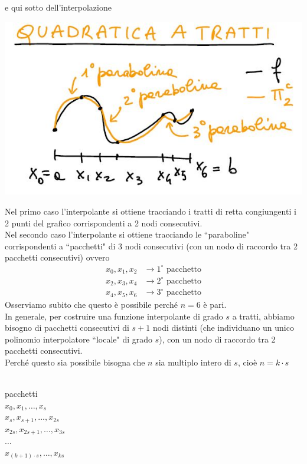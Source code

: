 \documentclass[12pt,a4paper]{article}
\begin{document}
e qui sotto dell'interpolazione\\
\begin{center}
    \includegraphics[scale=0.5]{calcolo3.JPG}
\end{center}
Nel primo caso l'interpolante si ottiene tracciando i tratti di retta congiungenti i 2 punti del grafico corrispondenti a 2 nodi consecutivi.\\
Nel secondo caso l'interpolante si ottiene tracciando le ``paraboline" corrispondenti a ``pacchetti" di 3 nodi consecutivi (con un nodo di raccordo tra 2 pacchetti consecutivi) ovvero
\[\begin{split}
    x_0,x_1,x_2 & \rightarrow 1^\circ \text{ pacchetto}\\
    x_2,x_3,x_4 & \rightarrow 2^\circ \text{ pacchetto}\\
    x_4,x_5,x_6 & \rightarrow 3^\circ \text{ pacchetto}
\end{split}\]
Osserviamo subito che questo è possibile perché $n=6$ è pari.\\
In generale, per costruire una funzione interpolante di grado $s$ a tratti, abbiamo bisogno di pacchetti consecutivi di $s+1$ nodi distinti (che individuano un unico polinomio interpolatore ``locale" di grado $s$), con un nodo di raccordo tra 2 pacchetti consecutivi.\\
Perché questo sia possibile bisogna che $n$ sia multiplo intero di $s$, cioè $n = k \cdot s$\\\\
\begin{minipage}{0.33\textwidth}
\begin{center}
    pacchetti\\
    $x_0, x_1, \dotso, x_s$\\
    $x_s, x_{s+1}, \dotso, x_{2s}$\\
    $x_{2s}, x_{2s+1}, \dotso, x_{3s}$\\
    $\dotso$\\
    $x_{(k+1) \cdot s}, \dotso, x_{ks}$
\end{center}
\end{minipage}
\end{document}

